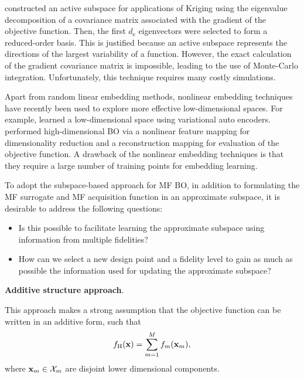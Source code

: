 \documentclass[iicol,sn-basic]{sn-jnl}%
\theoremstyle{thmstyleone}%
\theoremstyle{thmstyletwo}
\theoremstyle{thmstylethree}
\begin{document}
\begin{linenumbers}
\cite{Constantine2014} constructed an active subspace for applications of Kriging using the eigenvalue decomposition of a covariance matrix associated with the gradient of the objective function.
Then, the first $d_\text{e}$ eigenvectors were selected to form a reduced-order basis.
This is justified because an active subspace represents the directions of the largest variability of a function.
However, the exact calculation of the gradient covariance matrix is impossible, leading to the use of Monte-Carlo integration.
Unfortunately, this technique requires many costly simulations.  

Apart from random linear embedding methods, nonlinear embedding techniques have recently been used to explore more effective low-dimensional spaces.
For example, \cite{GomezBombarelli2018} learned a low-dimensional space using variational auto encoders.
\cite{Moriconi2020} performed high-dimensional BO via a nonlinear feature mapping for dimensionality reduction and a reconstruction mapping for evaluation of the objective function. 
A drawback of the nonlinear embedding techniques is that they require a large number of training points for embedding learning.

To adopt the subspace-based approach for MF BO, in addition to formulating the MF surrogate and MF acquisition function in an approximate subspace, it is desirable to address the following questions: 
\begin{itemize}
	\item Is this possible to facilitate learning the approximate subspace using information from multiple fidelities?
	
	\item How can we select a new design point and a fidelity level to gain as much as possible the information used for updating the approximate subspace?
\end{itemize}

\noindent 
\textbf{Additive structure approach}.

This approach makes a strong assumption that the objective function can be written in an additive form, such that~\citep{Kandasamy2015}
\begin{equation}\label{Eq67}
	f_\text{H}({\bf x}) = \sum_{m=1}^{M}f_m({\bf x}_m), 
\end{equation}
where ${\bf x}_m \in \mathcal{X}_m$ are disjoint lower dimensional components.


\end{linenumbers}
\end{document}
